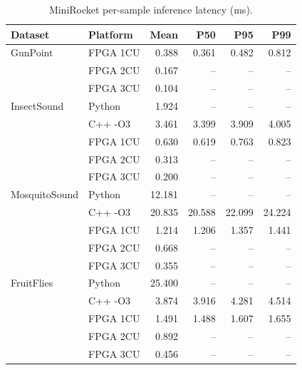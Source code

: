 \begin{table}[t]
\centering
\caption{MiniRocket per-sample inference latency (ms).}
\label{tab:latency}
\begin{tabular}{l l r r r r}
\toprule
Dataset & Platform & Mean & P50 & P95 & P99 \\
\midrule
GunPoint & FPGA 1CU & 0.388 & 0.361 & 0.482 & 0.812 \\
 & FPGA 2CU & 0.167 & -- & -- & -- \\
 & FPGA 3CU & 0.104 & -- & -- & -- \\
\addlinespace
InsectSound & Python & 1.924 & -- & -- & -- \\
 & C++ -O3 & 3.461 & 3.399 & 3.909 & 4.005 \\
 & FPGA 1CU & 0.630 & 0.619 & 0.763 & 0.823 \\
 & FPGA 2CU & 0.313 & -- & -- & -- \\
 & FPGA 3CU & 0.200 & -- & -- & -- \\
\addlinespace
MosquitoSound & Python & 12.181 & -- & -- & -- \\
 & C++ -O3 & 20.835 & 20.588 & 22.099 & 24.224 \\
 & FPGA 1CU & 1.214 & 1.206 & 1.357 & 1.441 \\
 & FPGA 2CU & 0.668 & -- & -- & -- \\
 & FPGA 3CU & 0.355 & -- & -- & -- \\
\addlinespace
FruitFlies & Python & 25.400 & -- & -- & -- \\
 & C++ -O3 & 3.874 & 3.916 & 4.281 & 4.514 \\
 & FPGA 1CU & 1.491 & 1.488 & 1.607 & 1.655 \\
 & FPGA 2CU & 0.892 & -- & -- & -- \\
 & FPGA 3CU & 0.456 & -- & -- & -- \\
\bottomrule
\end{tabular}
\end{table}
